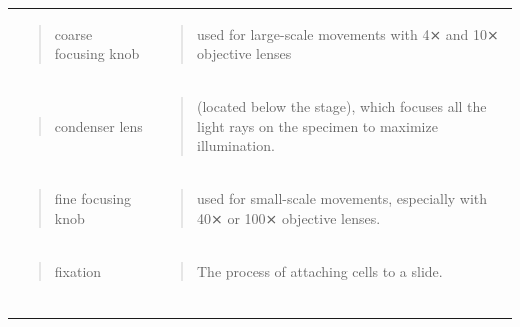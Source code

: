 \documentclass[
  letterpaper,
  DIV=11,
  numbers=noendperiod]{scrreprt}
\begin{document}
{\begin{longtable}[]{@{}
  >{\centering\arraybackslash}p{}
  >{\centering\arraybackslash}p{}@{}}
\begin{minipage}[t]{\linewidth}\centering
\begin{quote}
coarse focusing knob
\end{quote}
\end{minipage} & \begin{minipage}[t]{\linewidth}\centering
\begin{quote}
used for large-scale movements with 4⨯ and 10⨯ objective lenses
\end{quote}
\end{minipage} \\
\begin{minipage}[t]{\linewidth}\centering
\begin{quote}
condenser lens
\end{quote}
\end{minipage} & \begin{minipage}[t]{\linewidth}\centering
\begin{quote}
(located below the stage), which focuses all the light rays on the
specimen to maximize illumination.
\end{quote}
\end{minipage} \\
\begin{minipage}[t]{\linewidth}\centering
\begin{quote}
fine focusing knob
\end{quote}
\end{minipage} & \begin{minipage}[t]{\linewidth}\centering
\begin{quote}
used for small-scale movements, especially with 40⨯ or 100⨯ objective
lenses.
\end{quote}
\end{minipage} \\
\begin{minipage}[t]{\linewidth}\centering
\begin{quote}
fixation
\end{quote}
\end{minipage} & \begin{minipage}[t]{\linewidth}\centering
\begin{quote}
The process of attaching cells to a slide.
\end{quote}
\end{minipage} \\
\begin{minipage}[t]{\linewidth}\centering
\begin{quote}

\end{quote}
\end{minipage}
\end{longtable}}
\end{document}
